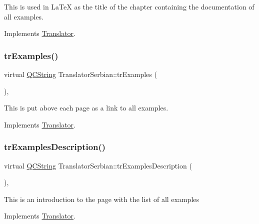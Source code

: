 This is used in La\+TeX as the title of the chapter containing the documentation of all examples. 

Implements \mbox{\hyperlink{class_translator}{Translator}}.

\mbox{\label{class_translator_serbian_a119d7dfc9d0c1693276c013ac7d0fa5e}} 
\subsubsection{\texorpdfstring{trExamples()}{trExamples()}}
{\footnotesize\ttfamily virtual \mbox{\hyperlink{class_q_c_string}{Q\+C\+String}} Translator\+Serbian\+::tr\+Examples (\begin{DoxyParamCaption}{ }\end{DoxyParamCaption})\hspace{0.3cm}{\ttfamily [inline]}, {\ttfamily [virtual]}}

This is put above each page as a link to all examples. 

Implements \mbox{\hyperlink{class_translator}{Translator}}.

\mbox{\label{class_translator_serbian_a5410a4017c9c75dbbf60b1889c3b49b8}} 
\subsubsection{\texorpdfstring{trExamplesDescription()}{trExamplesDescription()}}
{\footnotesize\ttfamily virtual \mbox{\hyperlink{class_q_c_string}{Q\+C\+String}} Translator\+Serbian\+::tr\+Examples\+Description (\begin{DoxyParamCaption}{ }\end{DoxyParamCaption})\hspace{0.3cm}{\ttfamily [inline]}, {\ttfamily [virtual]}}

This is an introduction to the page with the list of all examples 

Implements \mbox{\hyperlink{class_translator}{Translator}}.

\mbox{\label{class_translator_serbian_a51555af0ed9a514b8c4aa147417ef075}} 
